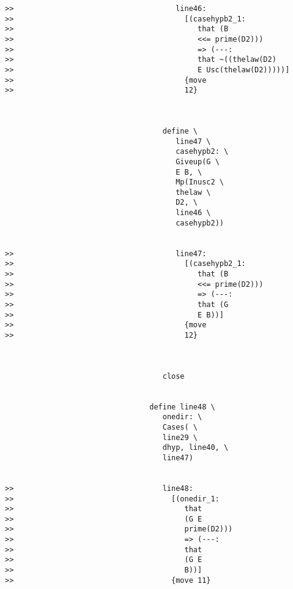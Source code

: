 \documentclass[12pt]{article}
\begin{document}
\begin{verbatim}
>>                                     line46:
>>                                       [(casehypb2_1:
>>                                          that (B
>>                                          <<= prime(D2)))
>>                                          => (---:
>>                                          that ~((thelaw(D2)
>>                                          E Usc(thelaw(D2)))))]
>>                                       {move
>>                                       12}



                                    define \
                                       line47 \
                                       casehypb2: \
                                       Giveup(G \
                                       E B, \
                                       Mp(Inusc2 \
                                       thelaw \
                                       D2, \
                                       line46 \
                                       casehypb2))


>>                                     line47:
>>                                       [(casehypb2_1:
>>                                          that (B
>>                                          <<= prime(D2)))
>>                                          => (---:
>>                                          that (G
>>                                          E B))]
>>                                       {move
>>                                       12}



                                    close


                                 define line48 \
                                    onedir: \
                                    Cases( \
                                    line29 \
                                    dhyp, line40, \
                                    line47)


>>                                  line48:
>>                                    [(onedir_1:
>>                                       that
>>                                       (G E
>>                                       prime(D2)))
>>                                       => (---:
>>                                       that
>>                                       (G E
>>                                       B))]
>>                                    {move 11}




\end{verbatim}
\end{document}
